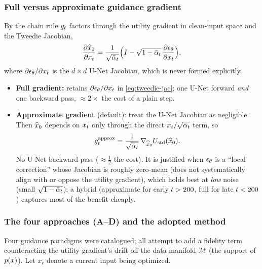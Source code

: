 \subsubsection{Full versus approximate guidance gradient}\label{sec:diff-approx}
By the chain rule $g_{t}$ factors through the utility gradient in clean-input
space and the Tweedie Jacobian,
\begin{equation}
\frac{\partial\widehat{x}_{0}}{\partial x_{t}}
   =\frac{1}{\sqrt{\bar{\alpha}_{t}}}\Big(I-\sqrt{1-\bar{\alpha}_{t}}\,\frac{\partial\epsilon_{\theta}}{\partial x_{t}}\Big),
\label{eq:tweedie-jac}
\end{equation}
where $\partial\epsilon_{\theta}/\partial x_{t}$ is the $d\times d$ U-Net Jacobian, which is
never formed explicitly.
\begin{itemize}[leftmargin=1.4em,itemsep=1pt,topsep=2pt]
  \item \textbf{Full gradient:} retains $\partial\epsilon_{\theta}/\partial x_{t}$ in
        \eqref{eq:tweedie-jac}; one U-Net forward \emph{and} one backward pass,
        $\approx2\times$ the cost of a plain step.
  \item \textbf{Approximate gradient} (default): treat the U-Net Jacobian as
        negligible. Then $\widehat{x}_{0}$ depends on $x_{t}$ only through the direct
        $x_{t}/\sqrt{\bar{\alpha}_{t}}$ term, so
        \begin{equation}
        g_{t}^{\mathrm{approx}}=\frac{1}{\sqrt{\bar{\alpha}_{t}}}\,\nabla_{\widehat{x}_{0}}U_{\mathrm{std}}(\widehat{x}_{0}).
        \label{eq:approx-grad}
        \end{equation}
        No U-Net backward pass ($\approx\tfrac12$ the cost). It is justified when
        $\epsilon_{\theta}$ is a ``local correction'' whose Jacobian is roughly zero-mean
        (does not systematically align with or oppose the utility gradient), which
        holds best at \emph{low} noise (small $\sqrt{1-\bar{\alpha}_{t}}$); a hybrid
        (approximate for early $t>200$, full for late $t<200$) captures most
        of the benefit cheaply.
\end{itemize}

\subsubsection{The four approaches (A--D) and the adopted method}
\label{sec:diff-approaches}
Four guidance paradigms were catalogued; all attempt to add a fidelity term
counteracting the utility gradient's drift off the data manifold $\mathcal{M}$ (the
support of $p(x)$). Let $x_{c}$ denote a current input being optimized.

